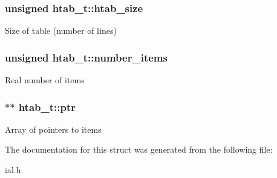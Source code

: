 \subsubsection[{\texorpdfstring{htab\+\_\+size}{htab_size}}]{\setlength{\rightskip}{0pt plus 5cm}unsigned htab\+\_\+t\+::htab\+\_\+size}\hypertarget{structhtab__t_a2565e30da8192e773408aa47e9c69b9c}{}\label{structhtab__t_a2565e30da8192e773408aa47e9c69b9c}
Size of table (number of lines) 
\subsubsection[{\texorpdfstring{number\+\_\+items}{number_items}}]{\setlength{\rightskip}{0pt plus 5cm}unsigned htab\+\_\+t\+::number\+\_\+items}\hypertarget{structhtab__t_a42e08f3235d283aa7a4bd4ce715083f6}{}\label{structhtab__t_a42e08f3235d283aa7a4bd4ce715083f6}
Real number of items 
\subsubsection[{\texorpdfstring{ptr}{ptr}}]{$\ast$$\ast$ htab\+\_\+t\+::ptr}\hypertarget{structhtab__t_a690071ddbcc17c986b7eb600d925a1dd}{}\label{structhtab__t_a690071ddbcc17c986b7eb600d925a1dd}
Array of pointers to items 

The documentation for this struct was generated from the following file\+:\begin{DoxyCompactItemize}
\item 
ial.\+h\end{DoxyCompactItemize}

